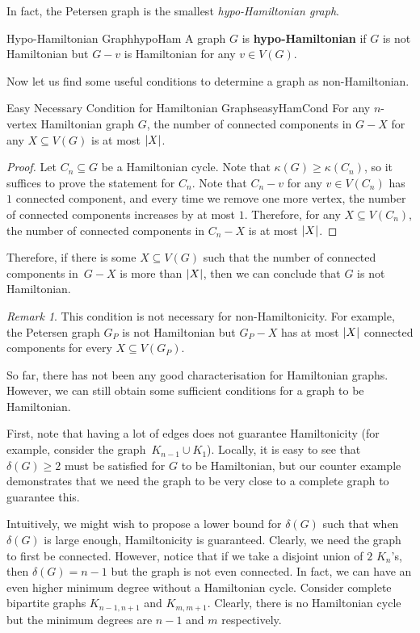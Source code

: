 \documentclass[math]{amznotes}
\theoremstyle{remark}
\newtheorem*{remark}{Remark}
\newcommand{\0}{\mathbf{0}}
\newcommand{\1}{\mathbf{1}}
\begin{document}
In fact, the Petersen graph is the smallest \textit{hypo-Hamiltonian graph}.
\begin{dfnbox}{Hypo-Hamiltonian Graph}{hypoHam}
    A graph $G$ is {\color{red} \textbf{hypo-Hamiltonian}} if $G$ is not Hamiltonian but $G - v$ is Hamiltonian for any $v \in V(G)$.
\end{dfnbox}
Now let us find some useful conditions to determine a graph as non-Hamiltonian. 
\begin{probox}{Easy Necessary Condition for Hamiltonian Graphs}{easyHamCond}
    For any $n$-vertex Hamiltonian graph $G$, the number of connected components in $G - X$ for any $X \subseteq V(G)$ is at most ${\left\lvert {X} \right\rvert}$.
    \tcblower
    \begin{proof}
        Let $C_n \subseteq G$ be a Hamiltonian cycle. Note that $\kappa(G) \geq \kappa(C_n)$, so it suffices to prove the statement for $C_n$. Note that $C_n - v$ for any $v \in V(C_n)$ has $1$ connected component, and every time we remove one more vertex, the number of connected components increases by at most $1$. Therefore, for any $X \subseteq V(C_n)$, the number of connected components in $C_n - X$ is at most ${\left\lvert {X} \right\rvert}$.
    \end{proof}
\end{probox}
Therefore, if there is some $X \subseteq V(G)$ such that the number of connected components in~$G - X$ is more than ${\left\lvert {X} \right\rvert}$, then we can conclude that $G$ is not Hamiltonian. 
\begin{notebox}
    \begin{remark}
        This condition is not necessary for non-Hamiltonicity. For example, the Petersen graph $G_P$ is not Hamiltonian but $G_P - X$ has at most ${\left\lvert {X} \right\rvert}$ connected components for every $X \subseteq V(G_P)$.
    \end{remark}
\end{notebox}
So far, there has not been any good characterisation for Hamiltonian graphs. However, we can still obtain some sufficient conditions for a graph to be Hamiltonian.

First, note that having a lot of edges does not guarantee Hamiltonicity (for example, consider the graph~$K_{n - 1} \cup K_1$). Locally, it is easy to see that $\delta(G) \geq 2$ must be satisfied for $G$ to be Hamiltonian, but our counter example demonstrates that we need the graph to be very close to a complete graph to guarantee this.

Intuitively, we might wish to propose a lower bound for $\delta(G)$ such that when $\delta(G)$ is large enough, Hamiltonicity is guaranteed. Clearly, we need the graph to first be connected. However, notice that if we take a disjoint union of $2$ $K_n$'s, then $\delta(G) = n - 1$ but the graph is not even connected. In fact, we can have an even higher minimum degree without a Hamiltonian cycle. Consider complete bipartite graphs $K_{n - 1, n + 1}$ and $K_{m, m + 1}$. Clearly, there is no Hamiltonian cycle but the minimum degrees are $n - 1$ and $m$ respectively.
\end{document}
